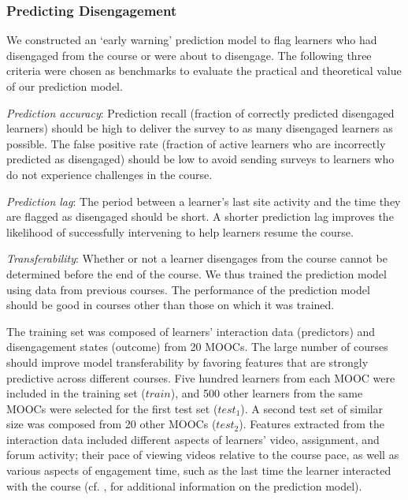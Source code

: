 \documentclass{sigchi}\usepackage[]{graphicx}\usepackage[]{color}
\begin{document}
\subsubsection{Predicting Disengagement}

We constructed an `early warning' prediction model to flag learners who had disengaged from the course or were about to disengage. The following three criteria were chosen as benchmarks to evaluate the practical and theoretical value of our prediction model.%

\textit{Prediction accuracy}: Prediction recall (fraction of correctly predicted disengaged learners) should be high to deliver the survey to as many disengaged learners as possible. The false positive rate (fraction of active learners who are incorrectly predicted as disengaged) should be low to avoid sending surveys to learners who do not experience challenges in the course.

\textit{Prediction lag}: The period between a learner's last site activity and the time they are flagged as disengaged should be short. A shorter prediction lag improves the likelihood of successfully intervening to help learners resume the course.

\textit{Transferability}: Whether or not a learner disengages from the course cannot be determined before the end of the course. We thus trained the prediction model using data from previous courses. The performance of the prediction model should be good in courses other than those on which it was trained.

The training set was composed of learners' interaction data (predictors) and disengagement states (outcome) from 20 MOOCs. The large number of courses should improve model transferability by favoring features that are strongly predictive across different courses. Five hundred learners from each MOOC were included in the training set ($train$), and 500 other learners from the same MOOCs were selected for the first test set ($test_1$). A second test set of similar size was composed from 20 other MOOCs ($test_2$). Features extracted from the interaction data included different aspects of learners' video, assignment, and forum activity; their pace of viewing videos relative to the course pace, as well as various aspects of engagement time, such as the last time the learner interacted with the course (cf. \cite{halawa2014dropout}, for additional information on the prediction model).
\end{document}
